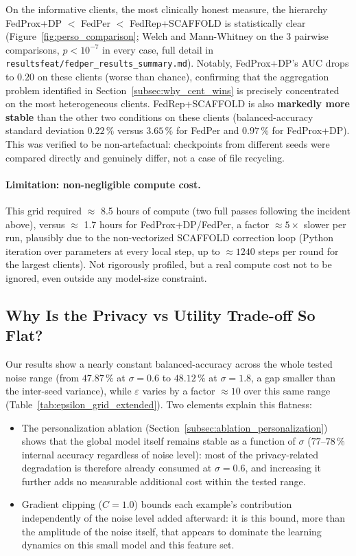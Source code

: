 \documentclass{article}
\begin{document}
On the informative clients, the most clinically honest measure, the hierarchy
FedProx+DP $<$ FedPer $<$ FedRep+SCAFFOLD is statistically clear
(Figure~\ref{fig:perso_comparison}; Welch and Mann-Whitney on the 3 pairwise
comparisons, $p < 10^{-7}$ in every case, full detail in
\texttt{resultsfeat/fedper\_results\_summary.md}). Notably, FedProx+DP's AUC
drops to $0.20$ on these clients (worse than chance), confirming that the
aggregation problem identified in Section~\ref{subsec:why_cent_wins} is
precisely concentrated on the most heterogeneous clients. FedRep+SCAFFOLD is
also \textbf{markedly more stable} than the other two conditions on these
clients (balanced-accuracy standard deviation $0.22\,\%$ versus $3.65\,\%$ for
FedPer and $0.97\,\%$ for FedProx+DP). This was verified to be non-artefactual:
checkpoints from different seeds were compared directly and genuinely differ,
not a case of file recycling.

\paragraph{Limitation: non-negligible compute cost.} This grid required
$\approx$ 8.5 hours of compute (two full passes following the incident above),
versus $\approx$ 1.7 hours for FedProx+DP/FedPer, a factor $\approx 5\times$
slower per run, plausibly due to the non-vectorized SCAFFOLD correction loop
(Python iteration over parameters at every local step, up to $\approx 1240$
steps per round for the largest clients). Not rigorously profiled, but a real
compute cost not to be ignored, even outside any model-size constraint.

\subsection{Why Is the Privacy vs Utility Trade-off So Flat?}

Our results show a nearly constant balanced-accuracy across the whole tested
noise range (from $47.87\,\%$ at $\sigma=0.6$ to $48.12\,\%$ at $\sigma=1.8$, a
gap smaller than the inter-seed variance), while $\varepsilon$ varies by a factor
$\approx 10$ over this same range (Table~\ref{tab:epsilon_grid_extended}). Two
elements explain this flatness:

\begin{itemize}
  \item The personalization ablation (Section~\ref{subsec:ablation_personalization})
  shows that the global model itself remains stable as a function of $\sigma$
  ($77$--$78\,\%$ internal accuracy regardless of noise level): most of the
  privacy-related degradation is therefore already consumed at $\sigma = 0.6$,
  and increasing it further adds no measurable additional cost within the tested
  range.
  \item Gradient clipping ($C=1.0$) bounds each example's contribution
  independently of the noise level added afterward: it is this bound, more than
  the amplitude of the noise itself, that appears to dominate the learning
  dynamics on this small model and this feature set.
\end{itemize}
\end{document}
